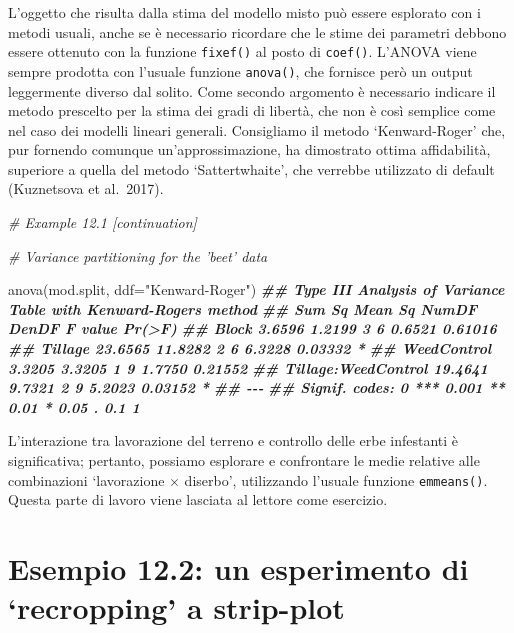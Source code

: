 \documentclass[
  12pt,
]{book}
\newenvironment{Shaded}{\begin{snugshade}}{\end{snugshade}}
\newcommand{\AttributeTok}[1]{\textcolor[rgb]{0.77,0.63,0.00}{#1}}
\newcommand{\CommentTok}[1]{\textcolor[rgb]{0.56,0.35,0.01}{\textit{#1}}}
\newcommand{\DocumentationTok}[1]{\textcolor[rgb]{0.56,0.35,0.01}{\textbf{\textit{#1}}}}
\newcommand{\FunctionTok}[1]{\textcolor[rgb]{0.00,0.00,0.00}{#1}}
\newcommand{\NormalTok}[1]{#1}
\newcommand{\StringTok}[1]{\textcolor[rgb]{0.31,0.60,0.02}{#1}}
\begin{document}
L'oggetto che risulta dalla stima del modello misto può essere esplorato con i metodi usuali, anche se è necessario ricordare che le stime dei parametri debbono essere ottenuto con la funzione \texttt{fixef()} al posto di \texttt{coef()}. L'ANOVA viene sempre prodotta con l'usuale funzione \texttt{anova()}, che fornisce però un output leggermente diverso dal solito. Come secondo argomento è necessario indicare il metodo prescelto per la stima dei gradi di libertà, che non è così semplice come nel caso dei modelli lineari generali. Consigliamo il metodo `Kenward-Roger' che, pur fornendo comunque un'approssimazione, ha dimostrato ottima affidabilità, superiore a quella del metodo `Sattertwhaite', che verrebbe utilizzato di default (Kuznetsova et al.~2017).

\begin{Shaded}
\begin{Highlighting}[]
\CommentTok{\# Example 12.1 [continuation]}

\CommentTok{\# Variance partitioning for the ’beet’ data}

\FunctionTok{anova}\NormalTok{(mod.split, }\AttributeTok{ddf=}\StringTok{"Kenward{-}Roger"}\NormalTok{)}
\DocumentationTok{\#\# Type III Analysis of Variance Table with Kenward{-}Roger\textquotesingle{}s method}
\DocumentationTok{\#\#                      Sum Sq Mean Sq NumDF DenDF F value  Pr(\textgreater{}F)  }
\DocumentationTok{\#\# Block                3.6596  1.2199     3     6  0.6521 0.61016  }
\DocumentationTok{\#\# Tillage             23.6565 11.8282     2     6  6.3228 0.03332 *}
\DocumentationTok{\#\# WeedControl          3.3205  3.3205     1     9  1.7750 0.21552  }
\DocumentationTok{\#\# Tillage:WeedControl 19.4641  9.7321     2     9  5.2023 0.03152 *}
\DocumentationTok{\#\# {-}{-}{-}}
\DocumentationTok{\#\# Signif. codes:  0 \textquotesingle{}***\textquotesingle{} 0.001 \textquotesingle{}**\textquotesingle{} 0.01 \textquotesingle{}*\textquotesingle{} 0.05 \textquotesingle{}.\textquotesingle{} 0.1 \textquotesingle{} \textquotesingle{} 1}
\end{Highlighting}
\end{Shaded}

L'interazione tra lavorazione del terreno e controllo delle erbe infestanti è significativa; pertanto, possiamo esplorare e confrontare le medie relative alle combinazioni `lavorazione \(\times\) diserbo', utilizzando l'usuale funzione \texttt{emmeans()}. Questa parte di lavoro viene lasciata al lettore come esercizio.

\hypertarget{esempio-12.2-un-esperimento-di-recropping-a-strip-plot}{%
\section{Esempio 12.2: un esperimento di `recropping' a strip-plot}\label{esempio-12.2-un-esperimento-di-recropping-a-strip-plot}}
\end{document}
